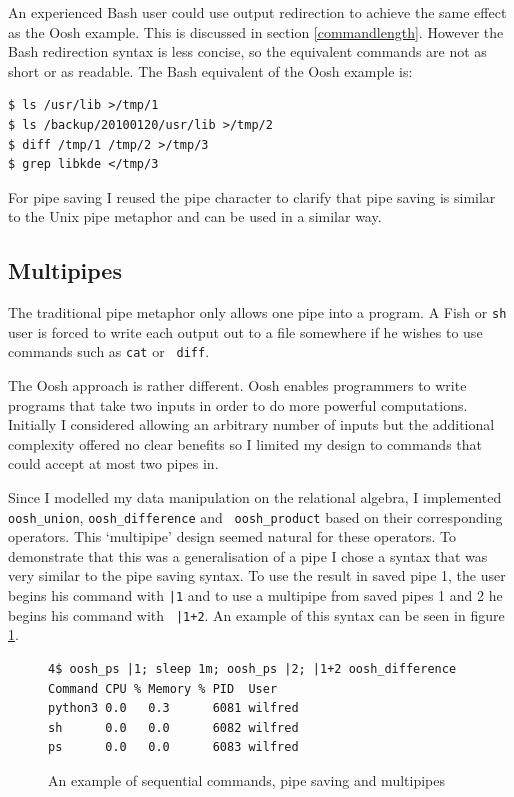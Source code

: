 \documentclass[12pt,twoside,notitlepage]{report}
\begin{document}
An experienced Bash user could use output redirection to achieve the
same effect as the Oosh example. This is discussed in section
\ref{commandlength}. However the Bash redirection syntax is less
concise, so the equivalent commands are not as short or as
readable. The Bash equivalent of the Oosh example is:

\begin{verbatim}
$ ls /usr/lib >/tmp/1
$ ls /backup/20100120/usr/lib >/tmp/2
$ diff /tmp/1 /tmp/2 >/tmp/3
$ grep libkde </tmp/3
\end{verbatim}

For pipe saving I reused the pipe character to clarify that pipe
saving is similar to the Unix pipe metaphor and can be used in a
similar way.

\subsection{Multipipes}

The traditional pipe metaphor only allows one pipe into a program. A
Fish or {\tt sh} user is forced to write each output out to a file
somewhere if he wishes to use commands such as {\tt cat} or {\tt
  diff}.

The Oosh approach is rather different. Oosh enables programmers to
write programs that take two inputs in order to do more powerful
computations. Initially I considered allowing an arbitrary number of
inputs but the additional complexity offered no clear benefits so I
limited my design to commands that could accept at most two pipes in.

Since I modelled my data manipulation on the relational algebra, I
implemented {\tt oosh\_union}, {\tt oosh\_difference} and {\tt
  oosh\_product} based on their corresponding operators. This
`multipipe' design seemed natural for these operators. To demonstrate
that this was a generalisation of a pipe I chose a syntax that was
very similar to the pipe saving syntax. To use the result in saved
pipe 1, the user begins his command with {\tt |1} and to use a
multipipe from saved pipes 1 and 2 he begins his command with {\tt
  |1+2}. An example of this syntax can be seen in figure \ref{multipipe}.

\begin{figure}[h]
\begin{Verbatim}[frame=single,framerule=0.2pt,framesep=5pt] 
4$ oosh_ps |1; sleep 1m; oosh_ps |2; |1+2 oosh_difference
Command CPU % Memory % PID  User
python3 0.0   0.3      6081 wilfred
sh      0.0   0.0      6082 wilfred
ps      0.0   0.0      6083 wilfred
\end{Verbatim}
\caption{An example of sequential commands, pipe saving and
  multipipes}
\label{multipipe}
\end{figure}
\end{document}

